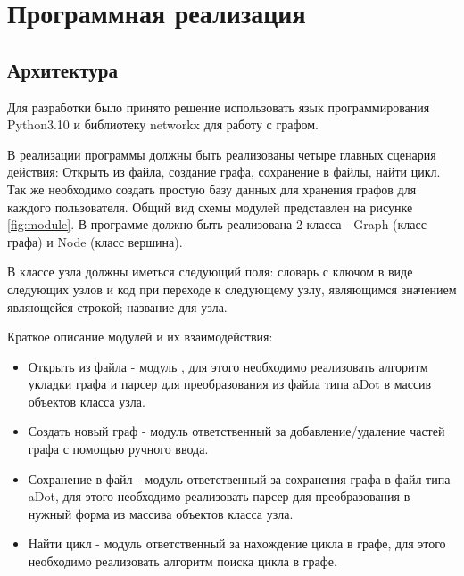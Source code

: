 \chapter{Программная реализация}\label{chap3_soft_architecture}
\section{Архитектура}

Для разработки было принято решение использовать язык программирования Python3.10 и библиотеку networkx для работу с графом.

В реализации программы должны быть реализованы четыре главных сценария действия: Открыть из файла, создание графа, сохранение в файлы, найти цикл. Так же необходимо создать простую базу данных для хранения графов для каждого пользователя. Общий вид схемы модулей представлен на рисунке \ref{fig:module}. В программе должно быть реализована 2 класса - Graph (класс графа) и Node (класс вершина). 

В классе узла должны иметься следующий поля: словарь с ключом в виде следующих узлов и код при переходе к следующему узлу, являющимся значением являющейся строкой; название для узла.

Краткое описание модулей и их взаимодействия:
\begin{itemize}
\item Открыть из файла - модуль , для этого необходимо реализовать алгоритм укладки графа и парсер для преобразования из файла типа aDot в массив объектов класса узла.
\item Создать новый граф - модуль ответственный за добавление/удаление частей графа с помощью ручного ввода.
\item Сохранение в файл - модуль ответственный за сохранения графа в файл типа aDot, для этого необходимо реализовать парсер для преобразования в нужный форма из массива объектов класса узла.
\item Найти цикл - модуль ответственный за нахождение цикла в графе, для этого необходимо реализовать алгоритм поиска цикла в графе.
\end{itemize}

